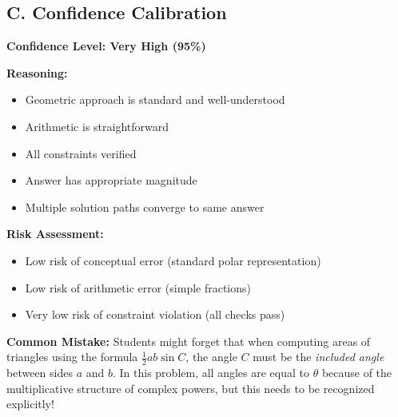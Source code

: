 \documentclass[12pt]{article}
\begin{document}
\begin{verificationbox}
\subsection*{C. Confidence Calibration}

\textbf{Confidence Level: Very High (95\%)}

\textbf{Reasoning:}
\begin{itemize}
    \item Geometric approach is standard and well-understood
    \item Arithmetic is straightforward
    \item All constraints verified
    \item Answer has appropriate magnitude
    \item Multiple solution paths converge to same answer
\end{itemize}

\textbf{Risk Assessment:}
\begin{itemize}
    \item Low risk of conceptual error (standard polar representation)
    \item Low risk of arithmetic error (simple fractions)
    \item Very low risk of constraint violation (all checks pass)
\end{itemize}
\end{verificationbox}

\vspace{1em}

\begin{warningbox}
\textbf{Common Mistake:} Students might forget that when computing areas of triangles using the formula $\frac{1}{2}ab\sin C$, the angle $C$ must be the \textit{included angle} between sides $a$ and $b$. In this problem, all angles are equal to $\theta$ because of the multiplicative structure of complex powers, but this needs to be recognized explicitly!
\end{warningbox}

\vspace{1em}
\end{document}

